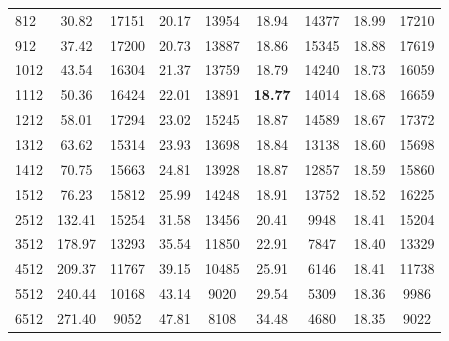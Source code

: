 \begin{table}[]
\begin{center}
\begin{tabular}{@{}lcccccccc@{}}
812    & 30.82                           & 17151 & 20.17                           & 13954 & 18.94                           & 14377 & 18.99                           & 17210 \\
912    & 37.42                           & 17200 & 20.73                           & 13887 & 18.86                           & 15345 & 18.88                           & 17619 \\
1012   & 43.54                           & 16304 & 21.37                           & 13759 & 18.79                           & 14240 & 18.73                           & 16059 \\
1112   & 50.36                           & 16424 & 22.01                           & 13891 & \textbf{18.77} & 14014 & 18.68                           & 16659 \\
1212   & 58.01                           & 17294 & 23.02                           & 15245 & 18.87                           & 14589 & 18.67                           & 17372 \\
1312   & 63.62                           & 15314 & 23.93                           & 13698 & 18.84                           & 13138 & 18.60                           & 15698 \\
1412   & 70.75                           & 15663 & 24.81                           & 13928 & 18.87                           & 12857 & 18.59                           & 15860 \\
1512   & 76.23                           & 15812 & 25.99                           & 14248 & 18.91                           & 13752 & 18.52                           & 16225 \\
2512   & 132.41                          & 15254 & 31.58                           & 13456 & 20.41                           & 9948  & 18.41                           & 15204 \\
3512   & 178.97                          & 13293 & 35.54                           & 11850 & 22.91                           & 7847  & 18.40                           & 13329 \\
4512   & 209.37                          & 11767 & 39.15                           & 10485 & 25.91                           & 6146  & 18.41                           & 11738 \\
5512   & 240.44                          & 10168 & 43.14                           & 9020  & 29.54                           & 5309  & 18.36                           & 9986  \\
6512   & 271.40                          & 9052  & 47.81                           & 8108  & 34.48                           & 4680  & 18.35                           & 9022  \\

\end{tabular}
\end{center}
\end{table}
